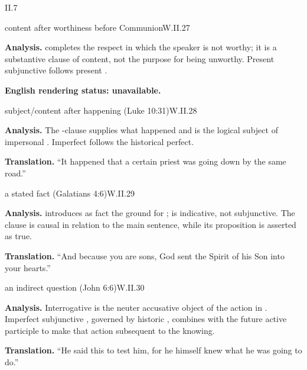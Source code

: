 \begin{courseunit}{II.7}
\begin{workedexample}{content after worthiness before Communion}{W.II.27}

\textbf{Analysis.}   completes the respect in which the speaker is not
worthy; it is a substantive clause of content, not the purpose for being unworthy.  Present
subjunctive  follows present .

\textbf{English rendering status: unavailable.}
\end{workedexample}

\begin{workedexample}{subject/content after happening (Luke 10:31)}{W.II.28}

\textbf{Analysis.}  The -clause supplies what happened and is the logical subject of
impersonal .  Imperfect  follows the historical perfect.

\textbf{Translation.}  ``It happened that a certain priest was going down by the same road.''
\end{workedexample}

\begin{workedexample}{a stated fact (Galatians 4:6)}{W.II.29}

\textbf{Analysis.}   introduces as fact the ground for ;
 is indicative, not subjunctive.  The clause is causal in relation to the main
sentence, while its proposition is asserted as true.

\textbf{Translation.}  ``And because you are sons, God sent the Spirit of his Son into your
hearts.''
\end{workedexample}

\begin{workedexample}{an indirect question (John 6:6)}{W.II.30}

\textbf{Analysis.}  Interrogative  is the neuter accusative object of the action
in .  Imperfect subjunctive , governed by historic
, combines with the future active participle to make that action subsequent to
the knowing.

\textbf{Translation.}  ``He said this to test him, for he himself knew what he was going to
do.''
\end{workedexample}


\end{courseunit}
